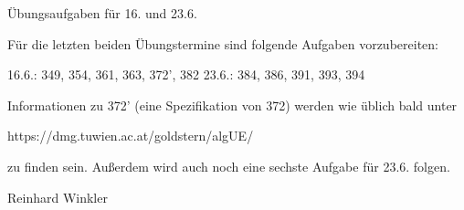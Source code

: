 Übungsaufgaben für 16. und 23.6.

Für die letzten beiden Übungstermine sind folgende Aufgaben vorzubereiten:

16.6.: 349, 354, 361, 363, 372', 382
23.6.: 384, 386, 391, 393, 394

Informationen zu 372' (eine Spezifikation von 372) werden wie üblich bald unter

https://dmg.tuwien.ac.at/goldstern/algUE/

zu finden sein. Außerdem wird auch noch eine sechste Aufgabe für 23.6. folgen.

Reinhard Winkler
